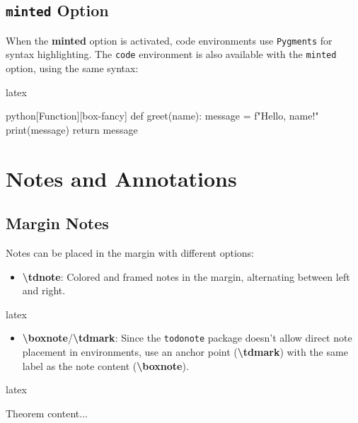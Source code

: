 \documentclass[
    margin=2cm
]{neoschool}
\begin{document}
\subsection{\texttt{minted} Option}

When the \textbf{minted} option is activated, code environments use
\texttt{Pygments} for syntax highlighting. The
\texttt{code} environment is also available with the
\texttt{minted} option, using the same syntax:

\begin{code}{latex}
\begin{code}[linenos,highlightlines={2,3}]{python}[Function][box-fancy]
def greet(name):
    message = f"Hello, {name}!"
    print(message)
    return message
\end{code}
\end{code}

\section{Notes and Annotations}

\subsection{Margin Notes}

Notes can be placed in the margin with different options:

\begin{itemize}
\item
  \textbf{\textbackslash tdnote}: Colored and framed notes in the margin, alternating
  between left and right.
\end{itemize}

\begin{code}{latex}
\end{code}

\begin{itemize}
\item
  \textbf{\textbackslash boxnote}/\textbf{\textbackslash tdmark}: Since the \texttt{todonote}
  package doesn't allow direct note placement in environments, use an
  anchor point (\textbf{\textbackslash tdmark}) with the same label as the note content
  (\textbf{\textbackslash boxnote}).
\end{itemize}

\begin{code}{latex}
\begin{theorem}
    \tdmark[thm1]  %
    Theorem content...
\end{theorem}
\end{code}
\end{document}
